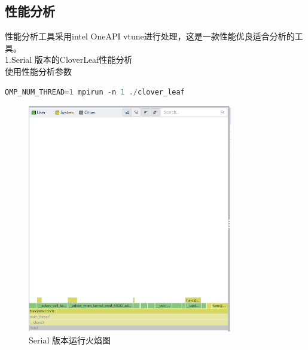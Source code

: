 \documentclass{article}
\begin{document}
\begin{CJK}{UTF8}{gbsn}
\subsection{性能分析}
性能分析工具采用intel OneAPI vtune进行处理，这是一款性能优良适合分析的工具。 \\
1.Serial 版本的CloverLeaf性能分析 \\
使用性能分析参数
\begin{lstlisting}[language=C++]
    OMP_NUM_THREAD=1 mpirun -n 1 ./clover_leaf
\end{lstlisting} 
\begin{figure}[H]
    \centering
    \includegraphics[width=0.8\textwidth]{./call1.png}
    \caption{Serial 版本运行火焰图}
\end{figure}


\end{CJK}
\end{document}
